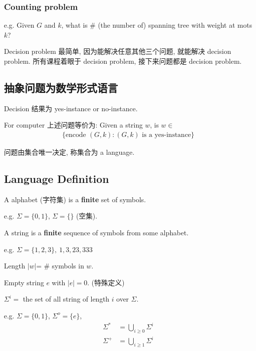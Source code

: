 \subsubsection{Counting problem}
e.g. Given $G$ and $k$, what is \# (the number of) spanning tree with weight at mots $k$?

Decision problem 最简单, 因为能解决任意其他三个问题, 就能解决 decision problem. 所有课程着眼于 decision problem, 接下来问题都是 decision problem. 

\subsection{抽象问题为数学形式语言}
Decision 结果为 yes-instance or no-instance. 

For computer 上述问题等价为: Given a string $w$, is $w \in $
\begin{align*}
    \{ \text{encode } (G, k): (G, k) \text{ is a yes-instance} \}
\end{align*}

问题由集合唯一决定, 称集合为 a language. 

\subsection{Language Definition}

\begin{definition}[Alphabet]
    A alphabet (字符集) is a \textbf{finite} set of symbols. 
\end{definition}

e.g. $\Sigma = \{0,1\}$, $\Sigma=\{  \}$ (空集). 


\begin{definition}[String]
    A string is a \textbf{finite} sequence of symbols from some alphabet. 
\end{definition}

e.g. $\Sigma=\{ 1,2,3 \},\ 1,3,23, 333$

Length $|w|$= \# symbols in $w$. 

Empty string $e$ with $|e|=0$. (特殊定义)

$\Sigma^i=$ the set of all string of length $i$ over $\Sigma$. 

e.g. $\Sigma=\{ 0, 1 \}$, $\Sigma^o=\{ e \}$, 
\begin{align*}
    \Sigma^*&=\bigcup_{i\ge 0}\Sigma^i\\
    \Sigma^+&= \bigcup_{i\ge 1} \Sigma^i
\end{align*}

